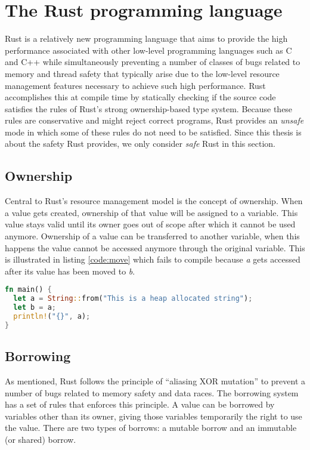\section{The Rust programming language}
\label{sec:rustbackground}
Rust is a relatively new programming language that aims to provide the high performance associated with other low-level programming languages such as C and C++ while simultaneously preventing a number of classes of bugs related to memory and thread safety that typically arise due to the low-level resource management features necessary to achieve such high performance.
Rust accomplishes this at compile time by statically checking if the source code satisfies the rules of Rust's strong ownership-based type system.
Because these rules are conservative and might reject correct programs, Rust provides an \textit{unsafe} mode in which some of these rules do not need to be satisfied.
Since this thesis is about the safety Rust provides, we only consider \textit{safe} Rust in this section.

\subsection{Ownership}
Central to Rust's resource management model is the concept of ownership.
When a value gets created, ownership of that value will be assigned to a variable.
This value stays valid until its owner goes out of scope after which it cannot be used anymore.
Ownership of a value can be transferred to another variable, when this happens the value cannot be accessed anymore through the original variable.
This is illustrated in listing \ref{code:move} which fails to compile because \textit{a} gets accessed after its value has been moved to \textit{b}.
\begin{lstlisting}[language=Rust,frame=single,caption=Moving a variable,label=code:move]
fn main() {
  let a = String::from("This is a heap allocated string");
  let b = a;
  println!("{}", a);
}
\end{lstlisting}

\subsection{Borrowing}
\label{subsec:borrowing}
As mentioned, Rust follows the principle of ``aliasing XOR mutation'' to prevent a number of bugs related to memory safety and data races.
The borrowing system has a set of rules that enforces this principle.
A value can be borrowed by variables other than its owner, giving those variables temporarily the right to use the value.
There are two types of borrows: a mutable borrow and an immutable (or shared) borrow. 

